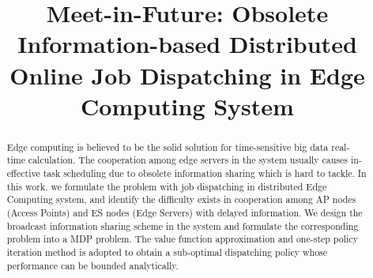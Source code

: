 \documentclass[10pt, conference, letterpaper]{IEEEtran}
\begin{document}
    \title{
        Meet-in-Future: Obsolete Information-based Distributed Online Job Dispatching in Edge Computing System
    }
    \author{
    }
    \maketitle

    \begin{abstract}
        \label{sec:abstract}
        Edge computing is believed to be the solid solution for time-sensitive big data real-time calculation. The cooperation among edge servers in the system usually causes in-effective task scheduling due to obsolete information sharing which is hard to tackle.
        In this work, we formulate the problem with job dispatching in distributed Edge Computing system, and identify the difficulty exists in cooperation among AP nodes (Access Points) and ES nodes (Edge Servers) with delayed information. We design the broadcast information sharing scheme in the system and formulate the corresponding problem into a MDP problem. The value function approximation and one-step policy iteration method is adopted to obtain a sub-optimal dispatching policy whose performance can be bounded analytically.
    \end{abstract}

\end{document}
